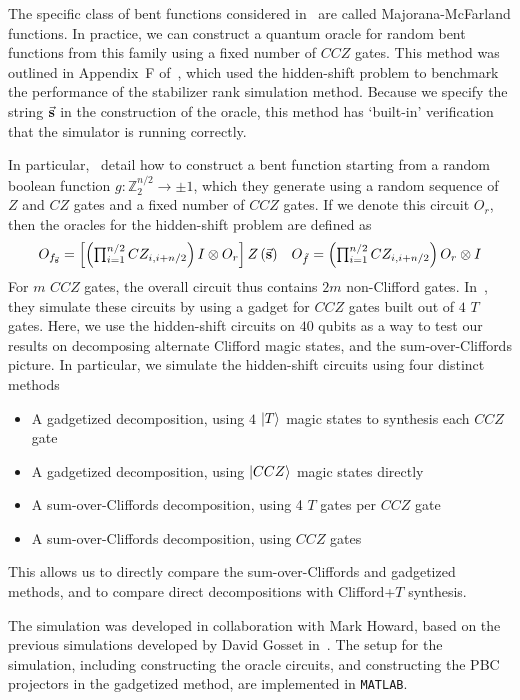 The specific class of bent functions considered in~\cite{Roetteler2008} are called Majorana-McFarland functions. In practice, we can construct a quantum oracle for random bent functions from this family using a fixed number of $CCZ$ gates. This method was outlined in Appendix~F of~\cite{Bravyi2016}, which used the hidden-shift problem to benchmark the performance of the stabilizer rank simulation method. Because we specify the string $\va{s}$ in the construction of the oracle, this method has `built-in' verification that the simulator is running correctly.\par
In particular,~\cite{Bravyi2016} detail how to construct a bent function starting from a random boolean function $g:\mathbb{Z}_{2}^{n/2}\rightarrow \pm 1$, which they generate using a random sequence of $Z$ and $CZ$ gates and a fixed number of $CCZ$ gates. If we denote this circuit $O_{r}$, then the oracles for the hidden-shift problem are defined as
\begin{equation}
\begin{array}{l r}
 O_{f_{\va{s}}} = \left[\left(\prod_{i=1}^{n/2}CZ_{i,i+n/2}\right)I\otimes O_{r}\right] Z\left(\va{s}\right) & O_{\tilde{f}} = \left(\prod_{i=1}^{n/2}CZ_{i,i+n/2}\right)O_{r}\otimes I
\end{array}
\end{equation}
For $m$ $CCZ$ gates, the overall circuit thus contains $2m$ non-Clifford gates. In~\cite{Bravyi2016}, they simulate these circuits by using a gadget for $CCZ$ gates built out of $4$ $T$ gates. Here, we use the hidden-shift circuits on $40$ qubits as a way to test our results on decomposing alternate Clifford magic states, and the sum-over-Cliffords picture. In particular, we simulate the hidden-shift circuits using four distinct methods
\begin{itemize}
    \item A gadgetized decomposition, using $4$ $\ket{T}$ magic states to synthesis each $CCZ$ gate
    \item A gadgetized decomposition, using $\ket{CCZ}$ magic states directly
    \item A sum-over-Cliffords decomposition, using 4 $T$ gates per $CCZ$ gate
    \item A sum-over-Cliffords decomposition, using $CCZ$ gates
\end{itemize}
This allows us to directly compare the sum-over-Cliffords and gadgetized methods, and to compare direct decompositions with Clifford+$T$ synthesis.\par
The simulation was developed in collaboration with Mark Howard, based on the previous simulations developed by David Gosset in~\cite{Bravyi2016}. The setup for the simulation, including constructing the oracle circuits, and constructing the PBC projectors in the gadgetized method, are implemented in \texttt{MATLAB}.\par

